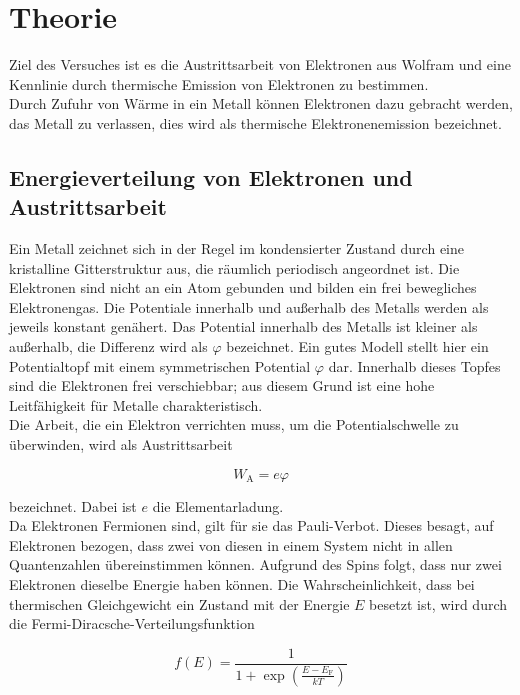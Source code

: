 \section{Theorie}
\label{sec:Theorie}

Ziel des Versuches ist es die Austrittsarbeit von Elektronen aus Wolfram und eine 
Kennlinie durch thermische Emission von Elektronen zu bestimmen. \\
Durch Zufuhr von Wärme in ein Metall können Elektronen dazu gebracht werden, 
das Metall zu verlassen, dies  wird als thermische Elektronenemission 
bezeichnet. 

\subsection{Energieverteilung von Elektronen und Austrittsarbeit}

Ein Metall zeichnet sich in der Regel im kondensierter Zustand durch eine 
kristalline Gitterstruktur aus, die räumlich periodisch angeordnet ist. Die 
Elektronen sind nicht an ein Atom gebunden und bilden ein frei bewegliches 
Elektronengas. Die Potentiale innerhalb und außerhalb des Metalls werden als 
jeweils konstant genähert. Das Potential innerhalb des Metalls ist kleiner 
als außerhalb, die Differenz wird als $\varphi$ bezeichnet. Ein gutes Modell
stellt hier ein Potentialtopf mit einem symmetrischen Potential $\varphi$ dar. 
Innerhalb dieses Topfes sind die Elektronen frei verschiebbar; aus diesem Grund 
ist eine hohe Leitfähigkeit für Metalle charakteristisch. \\
Die Arbeit, die ein Elektron verrichten muss, um die Potentialschwelle zu überwinden, 
wird als Austrittsarbeit 

\begin{equation*}
W_\text{A} = e\varphi
\end{equation*}

bezeichnet. Dabei ist $e$ die Elementarladung.\\
Da Elektronen Fermionen sind, gilt für sie das Pauli-Verbot. Dieses besagt,
auf Elektronen bezogen, dass zwei von diesen in einem System nicht in allen 
Quantenzahlen übereinstimmen können. Aufgrund des Spins folgt, dass nur zwei
Elektronen dieselbe Energie haben können. Die Wahrscheinlichkeit, dass bei 
thermischen Gleichgewicht ein Zustand mit der Energie $E$ besetzt ist, wird 
durch die Fermi-Diracsche-Verteilungsfunktion

\begin{equation*}
f(E) = \frac{1}{1+\exp{\left(\frac{E-E_\text{F}}{kT}\right)}}
\end{equation*}

